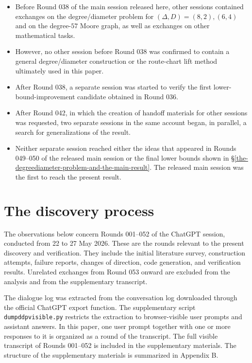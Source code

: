 \documentclass[11pt]{article}
\theoremstyle{definition}
\theoremstyle{remark}
\providecommand{\tightlist}{\setlength{\itemsep}{0pt}\setlength{\parskip}{0pt}}
\renewcommand{\_}{\textunderscore\allowbreak}
\begin{document}
\begin{itemize}
\tightlist
\item
  Before Round 038 of the main session released here, other sessions
  contained exchanges on the degree/diameter problem for
  \((\Delta,D)=(8,2),(6,4)\) and on the degree-\(57\) Moore graph, as
  well as exchanges on other mathematical tasks.
\item
  However, no other session before Round 038 was confirmed to contain a
  general degree/diameter construction or the route-chart lift method
  ultimately used in this paper.
\item
  After Round 038, a separate session was started to verify the first
  lower-bound-improvement candidate obtained in Round 036.
\item
  After Round 042, in which the creation of handoff materials for other
  sessions was requested, two separate sessions in the same account
  began, in parallel, a search for generalizations of the result.
\item
  Neither separate session reached either the ideas that appeared in
  Rounds 049--050 of the released main session or the final lower bounds
  shown in \S\ref{the-degreediameter-problem-and-the-main-result}. The released main session was the first to reach the
  present result.
\end{itemize}


\section{The discovery process}\label{the-discovery-process}

The observations below concern Rounds 001--052 of the ChatGPT session,
conducted from 22 to 27 May 2026. These are the rounds relevant to the
present discovery and verification. They include the initial literature
survey, construction attempts, failure reports, changes of direction,
code generation, and verification results. Unrelated exchanges from
Round 053 onward are excluded from the analysis and from the
supplementary transcript.

The dialogue log was extracted from the conversation log downloaded
through the official ChatGPT export function. The supplementary script
\texttt{dump\_ddp\_visible.py} restricts the extraction to
browser-visible user prompts and assistant answers. In this paper, one
user prompt together with one or more responses to it is organized as a
round of the transcript. The full visible transcript of Rounds 001--052
is included in the supplementary materials. The structure of the
supplementary materials is summarized in Appendix B.
\end{document}
